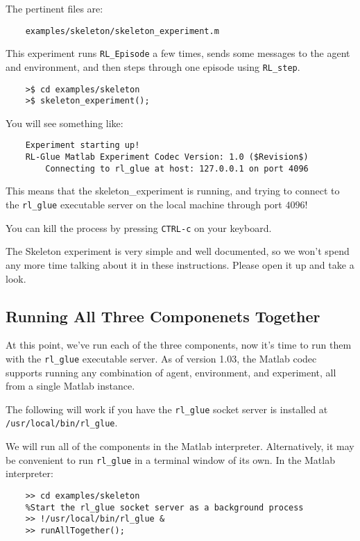 \documentclass[11pt]{article}
\begin{document}
The pertinent files are:
\begin{verbatim}
	examples/skeleton/skeleton_experiment.m
\end{verbatim}

This experiment runs \texttt{RL\_Episode} a few times, sends some messages to the agent and environment, and then steps through one episode using \texttt{RL\_step}.

\begin{verbatim}
	>$ cd examples/skeleton
	>$ skeleton_experiment();
\end{verbatim}

You will see something like:
\begin{verbatim}
	Experiment starting up!
	RL-Glue Matlab Experiment Codec Version: 1.0 ($Revision$)
	    Connecting to rl_glue at host: 127.0.0.1 on port 4096
\end{verbatim}

This means that the skeleton\_experiment is running, and trying to connect to the \texttt{rl\_glue} executable server on the local machine through port $4096$!  

You can kill the process by pressing \texttt{CTRL-c} on your keyboard.

The Skeleton experiment is very simple and well documented, so we won't spend any more time talking about it in these instructions.
Please open it up and take a look.

\subsection{Running All Three Componenets Together}
At this point, we've run each of the three components, now it's time to run them with the \texttt{rl\_glue} executable server.  As of version 1.03, the Matlab codec supports running any combination of agent, environment, and experiment, all from a single Matlab instance.

The following will work if you have the \texttt{rl\_glue} socket server is installed at \texttt{/usr/local/bin/rl\_glue}.

We will run all of the components in the Matlab interpreter.  Alternatively, it may be convenient to run \texttt{rl\_glue} in a terminal window of its own.
In the Matlab interpreter:
\begin{verbatim}
	>> cd examples/skeleton
	%Start the rl_glue socket server as a background process
	>> !/usr/local/bin/rl_glue &
	>> runAllTogether();
\end{verbatim}
\end{document}
